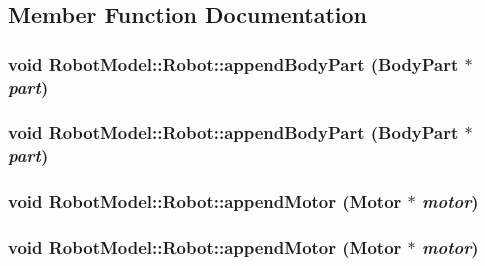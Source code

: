 \subsection{Member Function Documentation}
\hypertarget{class_robot_model_1_1_robot_a44d1922d7d9ea6c7c90360c2443b1ec3}{
\subsubsection[{appendBodyPart}]{\setlength{\rightskip}{0pt plus 5cm}void RobotModel::Robot::appendBodyPart ({\bf BodyPart} $\ast$ {\em part})}}
\label{class_robot_model_1_1_robot_a44d1922d7d9ea6c7c90360c2443b1ec3}
\hypertarget{class_robot_model_1_1_robot_a44d1922d7d9ea6c7c90360c2443b1ec3}{
\subsubsection[{appendBodyPart}]{\setlength{\rightskip}{0pt plus 5cm}void RobotModel::Robot::appendBodyPart ({\bf BodyPart} $\ast$ {\em part})}}
\label{class_robot_model_1_1_robot_a44d1922d7d9ea6c7c90360c2443b1ec3}
\hypertarget{class_robot_model_1_1_robot_aa4db18e00b4e4c56a37943a0b45d1c3b}{
\subsubsection[{appendMotor}]{\setlength{\rightskip}{0pt plus 5cm}void RobotModel::Robot::appendMotor ({\bf Motor} $\ast$ {\em motor})}}
\label{class_robot_model_1_1_robot_aa4db18e00b4e4c56a37943a0b45d1c3b}
\hypertarget{class_robot_model_1_1_robot_aa4db18e00b4e4c56a37943a0b45d1c3b}{
\subsubsection[{appendMotor}]{\setlength{\rightskip}{0pt plus 5cm}void RobotModel::Robot::appendMotor ({\bf Motor} $\ast$ {\em motor})}}
